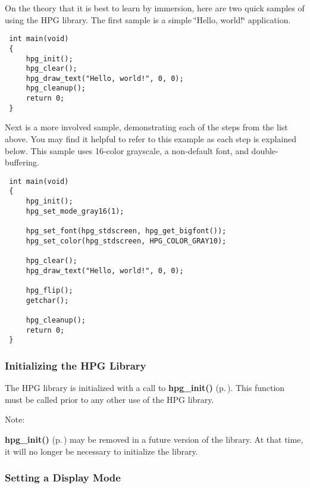 On the theory that it is best to learn by immersion, here are two quick samples of using the HPG library. The first sample is a simple \char`\"{}Hello, world!\char`\"{} application.



\footnotesize\begin{verbatim} int main(void)
 {
     hpg_init();
     hpg_clear();
     hpg_draw_text("Hello, world!", 0, 0);
     hpg_cleanup();
     return 0;
 }
\end{verbatim}\normalsize 


Next is a more involved sample, demonstrating each of the steps from the list above. You may find it helpful to refer to this example as each step is explained below. This sample uses 16-color grayscale, a non-default font, and double-buffering.



\footnotesize\begin{verbatim} int main(void)
 {
     hpg_init();
     hpg_set_mode_gray16(1);
 
     hpg_set_font(hpg_stdscreen, hpg_get_bigfont());
     hpg_set_color(hpg_stdscreen, HPG_COLOR_GRAY10);
 
     hpg_clear();
     hpg_draw_text("Hello, world!", 0, 0);
 
     hpg_flip();
     getchar();
 
     hpg_cleanup();
     return 0;
 }
\end{verbatim}\normalsize 


\subsubsection{Initializing the HPG Library}\label{init}


The HPG library is initialized with a call to {\bf hpg\_\-init()} {\rm (p.\,\pageref{hpgraphics_8h_a28})}. This function must be called prior to any other use of the HPG library.

\begin{Desc}
\item[Note: ]\par
{\bf hpg\_\-init()} {\rm (p.\,\pageref{hpgraphics_8h_a28})} may be removed in a future version of the library. At that time, it will no longer be necessary to initialize the library.\end{Desc}
\subsubsection{Setting a Display Mode}\label{mode}


